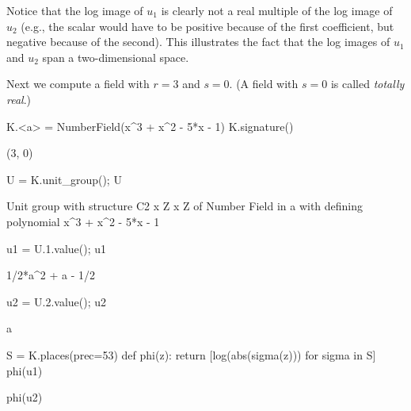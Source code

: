 Notice that the log image of $u_1$ is clearly not a real multiple of
the log image of $u_2$ (e.g., the scalar would have to be positive
because of the first coefficient, but negative because of the second).
This illustrates the fact that the log images of $u_1$ and $u_2$ span
a two-dimensional space.

Next we compute a field with $r=3$ and $s=0$.
(A field with $s=0$ is called \emph{totally real}.)
\begin{sagecode}
\begin{sagecell}
K.<a> = NumberField(x^3 + x^2 - 5*x - 1)
K.signature()
\end{sagecell}
\begin{sageout}
(3, 0)
\end{sageout}
\begin{sagecell}
U = K.unit_group(); U
\end{sagecell}
\begin{sageout}
Unit group with structure C2 x Z x Z of Number Field in a with
defining polynomial x^3 + x^2 - 5*x - 1
\end{sageout}
\begin{sagecell}
u1 = U.1.value(); u1
\end{sagecell}
\begin{sageout}
1/2*a^2 + a - 1/2
\end{sageout}
\begin{sagecell}
u2 = U.2.value(); u2
\end{sagecell}
\begin{sageout}
a
\end{sageout}
\begin{sagecell}
S = K.places(prec=53)
def phi(z):
    return [log(abs(sigma(z))) for sigma in S]
phi(u1)
\end{sagecell}
\begin{sageout}
[-0.7747670223461895, -0.3928487245813982, 1.1676157469275887]
\end{sageout}
\begin{sagecell}
phi(u2)
\end{sagecell}
\begin{sageout}
[0.9966812040934553, -1.6402241503223172, 0.6435429462288627]
\end{sageout}
\end{sagecode}

